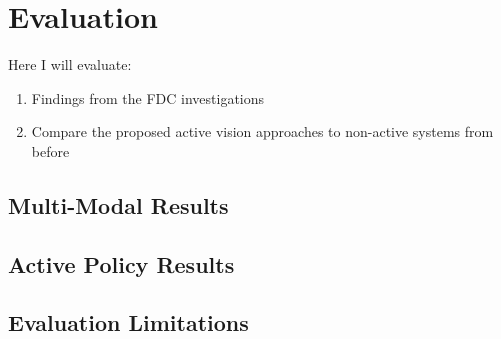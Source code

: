 \chapter{Evaluation}\label{ch:eval}
Here I will evaluate:
\begin{enumerate}
  \item Findings from the FDC investigations
  \item Compare the proposed active vision approaches to non-active systems from before
\end{enumerate}





\section{Multi-Modal Results}

  

  
  
  

  

  
  
  

\section{Active Policy Results}\todo{}

\section{Evaluation Limitations}\todo{}



